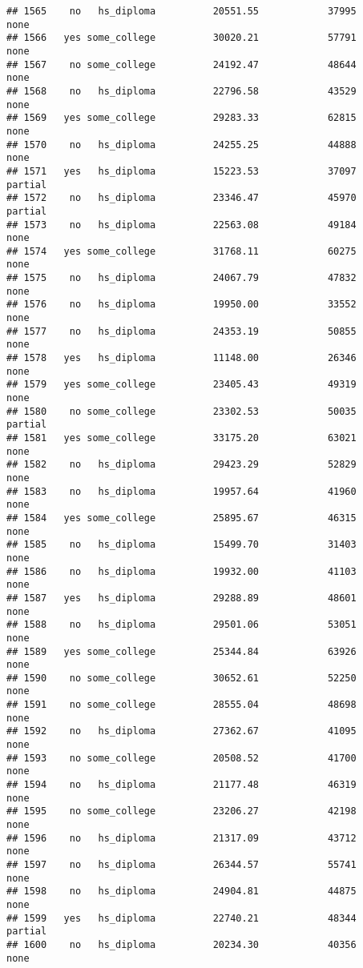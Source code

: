 \documentclass[
]{article}
\begin{document}
\begin{verbatim}
## 1565    no   hs_diploma          20551.55            37995        none
## 1566   yes some_college          30020.21            57791        none
## 1567    no some_college          24192.47            48644        none
## 1568    no   hs_diploma          22796.58            43529        none
## 1569   yes some_college          29283.33            62815        none
## 1570    no   hs_diploma          24255.25            44888        none
## 1571   yes   hs_diploma          15223.53            37097     partial
## 1572    no   hs_diploma          23346.47            45970     partial
## 1573    no   hs_diploma          22563.08            49184        none
## 1574   yes some_college          31768.11            60275        none
## 1575    no   hs_diploma          24067.79            47832        none
## 1576    no   hs_diploma          19950.00            33552        none
## 1577    no   hs_diploma          24353.19            50855        none
## 1578   yes   hs_diploma          11148.00            26346        none
## 1579   yes some_college          23405.43            49319        none
## 1580    no some_college          23302.53            50035     partial
## 1581   yes some_college          33175.20            63021        none
## 1582    no   hs_diploma          29423.29            52829        none
## 1583    no   hs_diploma          19957.64            41960        none
## 1584   yes some_college          25895.67            46315        none
## 1585    no   hs_diploma          15499.70            31403        none
## 1586    no   hs_diploma          19932.00            41103        none
## 1587   yes   hs_diploma          29288.89            48601        none
## 1588    no   hs_diploma          29501.06            53051        none
## 1589   yes some_college          25344.84            63926        none
## 1590    no some_college          30652.61            52250        none
## 1591    no some_college          28555.04            48698        none
## 1592    no   hs_diploma          27362.67            41095        none
## 1593    no some_college          20508.52            41700        none
## 1594    no   hs_diploma          21177.48            46319        none
## 1595    no some_college          23206.27            42198        none
## 1596    no   hs_diploma          21317.09            43712        none
## 1597    no   hs_diploma          26344.57            55741        none
## 1598    no   hs_diploma          24904.81            44875        none
## 1599   yes   hs_diploma          22740.21            48344     partial
## 1600    no   hs_diploma          20234.30            40356        none

\end{verbatim}
\end{document}
